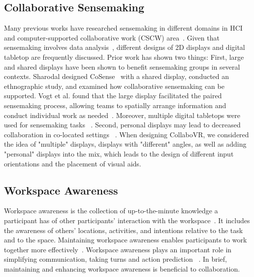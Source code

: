 \documentclass{sigchi}
\begin{document}
\subsection{Collaborative Sensemaking}
Many previous works have researched sensemaking in different domains in HCI and computer-supported collaborative work (CSCW) area~\cite{albolino2007sensemaking, billman2007medical, landgren2007study,paul2009understanding}. Given that sensemaking involves data analysis~\cite{yi2008understanding}, different designs of 2D displays and digital tabletop are frequently discussed. Prior work has shown two things: First, large and shared displays have been shown to benefit sensemaking groups in several contexts. Sharodal designed CoSense~\cite{dervin1992mind} with a shared display, conducted an ethnographic study, and examined how collaborative sensemaking can be supported. Vogt et al. found that the large display facilitated the paired sensemaking process, allowing teams to spatially arrange information and conduct individual work as needed~\cite{vogt2011co}. Moreover, multiple digital tabletops were used for sensemaking tasks ~\cite{isenberg2010exploratory,morris2010wesearch}. Second, personal displays may lead to decreased collaboration in co-located settings ~\cite{chung2013investigating, wallace2009investigating}.
When designing CollaboVR, we considered the idea of "multiple" displays, displays with "different" angles, as well as adding "personal" displays into the mix, which leads to the design of different input orientations and the placement of visual aids.

\subsection{Workspace Awareness}
Workspace awareness is the collection of up-to-the-minute knowledge a participant has of other participants' interaction with the workspace~\cite{gutwin1996workspace}. It includes the awareness of others' locations, activities, and intentions relative to the task and to the space. Maintaining workspace awareness enables participants to work together more effectively~\cite{gutwin1998design, gutwin2002descriptive}. Workspace awareness plays an important role in simplifying communication, taking turns and action prediction ~\cite{gutwin2002descriptive}. In brief, maintaining and enhancing workspace awareness is beneficial to collaboration. 
\end{document}

